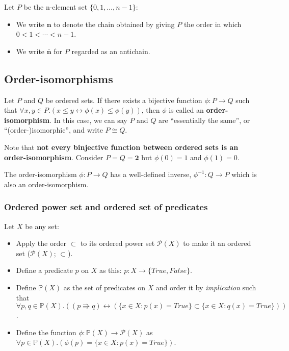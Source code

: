 \documentclass[12pt, letterpaper, oneside]{book}
\begin{document}
Let $P$ be the n-element set $\{0, 1, \ldots, n-1\}$:
\begin{itemize}
  \item We write $\mathbf{n}$ to denote the chain obtained by giving $P$ the order in which $0 < 1 < \cdots < n - 1$.
  \item We write $\mathbf{\bar{n}}$ for $P$ regarded as an antichain.
\end{itemize}

\subsection{Order-isomorphisms}

Let $P$ and $Q$ be ordered sets. If there exists a bijective function $\phi: P \rightarrow Q$ such that
$\forall x, y \in P. (x \leqslant y \leftrightarrow \phi(x) \leqslant \phi(y))$, then $\phi$ is called an \textbf{order-
  isomorphism}. In this case, we can say $P$ and $Q$ are ``essentially the same'', or ``(order-)isomorphic'', and write
$P \cong Q$.

Note that \textbf{not every binjective function between ordered sets is an order-isomorphism}. Consider $P = Q = \mathbf{2}$
but $\phi(0) = 1$ and $\phi(1) = 0$.

The order-isomorphism $\phi: P \rightarrow Q$ has a well-defined inverse, $\phi^{-1}: Q \rightarrow P$ which is also an
order-isomorphism.

\subsubsection{Ordered power set and ordered set of predicates}

Let $X$ be any set:
\begin{itemize}
  \item Apply the order $\subset$ to its ordered power set $\mathcal{P}(X)$ to make it an ordered set ($\mathcal{P}(X)$;
        $\subset$).
  \item Define a predicate $p$ on $X$ as this: $p: X \rightarrow \{True, False\}$.
  \item Define $\mathbb{P}(X)$ as the set of predicates on $X$ and order it by \textit{implication} such that
        $\forall p, q \in \mathbb{P}(X). ((p \Rrightarrow q) \leftrightarrow (\{x \in X: p(x) = True\} \subset
          \{x \in X: q(x) = True\}))$.
  \item Define the function $\phi: \mathbb{P}(X) \rightarrow \mathcal{P}(X)$ as $\forall p \in \mathbb{P}(X). (\phi(p)
          = \{x \in X: p(x) = True\})$.
\end{itemize}
\end{document}
